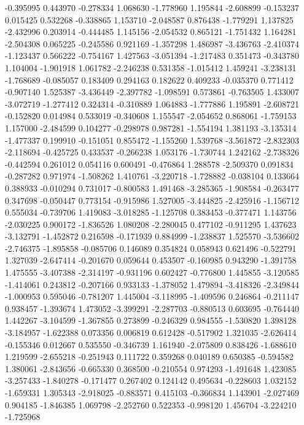-0.395995
0.443970
-0.278334
1.068630
-1.778960
1.195844
-2.608899
-0.153237
0.015425
0.532268
-0.338865
1.153710
-2.048587
0.876438
-1.779291
1.137825
-2.432996
0.203914
-0.444485
1.145156
-2.054532
0.865121
-1.751432
1.164281
-2.504308
0.065225
-0.245586
0.921169
-1.357298
1.486987
-3.436763
-2.410374
-1.123437
0.566222
-0.754167
1.427563
-3.051394
-1.217483
0.351473
-0.343780
1.104004
-1.901918
1.061782
-2.246238
0.531358
-1.015412
1.459241
-3.238131
-1.768689
-0.085057
0.183409
0.294163
0.182622
0.409233
-0.035370
0.771412
-0.907140
1.525387
-3.436449
-2.397782
-1.098591
0.573861
-0.763505
1.433007
-3.072719
-1.277412
0.324314
-0.310889
1.064883
-1.777886
1.195891
-2.608721
-0.152820
0.014984
0.533019
-0.340608
1.155547
-2.054652
0.868061
-1.759153
1.157000
-2.484599
0.104277
-0.298978
0.987281
-1.554194
1.381193
-3.135314
-1.477337
0.199910
-0.151051
0.855472
-1.155260
1.539768
-3.561872
-2.832303
-2.118694
-0.425725
0.433537
-0.266238
1.053176
-1.730744
1.242162
-2.738326
-0.442594
0.261012
0.054116
0.600491
-0.476864
1.288578
-2.509370
0.091834
-0.287282
0.971974
-1.508262
1.410761
-3.220718
-1.728882
-0.038104
0.133664
0.388933
-0.010294
0.731017
-0.800583
1.491468
-3.285365
-1.908584
-0.263477
0.347698
-0.050447
0.773154
-0.915986
1.527005
-3.444825
-2.425916
-1.156712
0.555034
-0.739706
1.419083
-3.018285
-1.125708
0.383453
-0.377471
1.143756
-2.030225
0.900172
-1.836526
1.080208
-2.280045
0.477102
-0.911295
1.437623
-3.132791
-1.452872
0.216598
-0.171939
0.884999
-1.238837
1.525570
-3.536602
-2.746375
-1.895858
-0.085706
0.146089
0.354824
0.058943
0.621496
-0.522791
1.327039
-2.647414
-0.201670
0.059644
0.453507
-0.160985
0.943290
-1.391758
1.475555
-3.407388
-2.314197
-0.931196
0.602427
-0.776800
1.445855
-3.120585
-1.414061
0.243812
-0.207166
0.933133
-1.378052
1.479894
-3.418326
-2.349844
-1.000953
0.595046
-0.781207
1.445004
-3.118995
-1.409596
0.246864
-0.211147
0.938457
-1.393674
1.473052
-3.399291
-2.287703
-0.880513
0.603695
-0.764440
1.442267
-3.104599
-1.367855
0.273899
-0.246329
0.984555
-1.530820
1.398128
-3.184957
-1.622388
0.073356
0.006819
0.612428
-0.517902
1.321035
-2.626414
-0.155346
0.012667
0.535550
-0.346739
1.161940
-2.075809
0.838426
-1.688610
1.219599
-2.655218
-0.251943
0.111722
0.359268
0.040189
0.650385
-0.594582
1.380061
-2.843656
-0.665330
0.368500
-0.210554
0.974293
-1.491648
1.423085
-3.257433
-1.840278
-0.171477
0.267402
0.124142
0.495634
-0.228603
1.032152
-1.659331
1.305343
-2.918025
-0.883571
0.415103
-0.366834
1.143901
-2.027469
0.904185
-1.846385
1.069798
-2.252760
0.522353
-0.998120
1.456704
-3.224210
-1.725968
